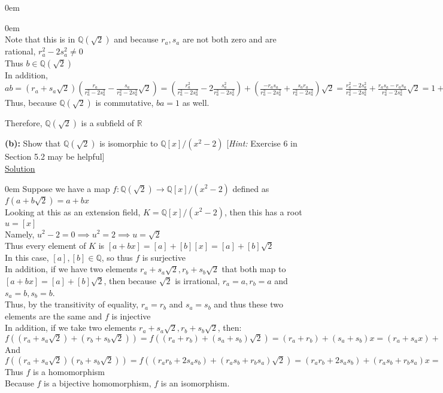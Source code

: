 \documentclass{article} %
\begin{document}
\begin{addmargin}[1em]{0em}
\begin{addmargin}[1em]{0em}
\\Note that this is in $\mathbb{Q}(\sqrt{2})$ and because $r_a, s_a$ are not both zero and are rational, $r_a^2 - 2s_a^2 \neq 0$
\\Thus $b \in \mathbb{Q}(\sqrt{2})$
\\In addition, $ab = (r_a + s_a\sqrt{2})(\frac{r_a}{r_a^2-2s_a^2} - \frac{s_a}{r_a^2-2s_a^2}\sqrt{2}) = (\frac{r_a^2}{r_a^2-2s_a^2} - 2\frac{s_a^2}{r_a^2 - 2s_a^2}) + (\frac{-r_as_a}{r_a^2-2s_a^2} + \frac{s_ar_a}{r_a^2-2s_a^2})\sqrt{2} = \frac{r_a^2 - 2s_a^2}{r_a^2- 2s_a^2} + \frac{r_as_a - r_as_a}{r_a^2 - 2s_a^2}\sqrt{2} = 1 + 0\sqrt{2} = 1$
\\Thus, because $\mathbb{Q}(\sqrt{2})$ is commutative, $ba = 1$ as well.
\end{addmargin}
Therefore, $\mathbb{Q}(\sqrt{2})$ is a subfield of $\mathbb{R}$
\end{addmargin}

\textbf{(b):} Show that $\mathbb{Q}(\sqrt{2})$ is isomorphic to $\mathbb{Q}[x]/(x^2-2)$ [\textit{Hint: }Exercise 6 in Section 5.2 may be helpful]
\\

\underline{Solution}
\begin{addmargin}[1em]{0em}
Suppose we have a map $f: \mathbb{Q}(\sqrt{2}) \rightarrow \mathbb{Q}[x]/(x^2-2)$ defined as $f(a+b\sqrt{2}) = a + bx$
\\Looking at this as an extension field, $K = \mathbb{Q}[x]/(x^2-2)$, then this has a root $u = [x]$
\\Namely, $u^2 - 2  = 0 \implies u^2 = 2 \implies u = \sqrt{2}$
\\Thus every element of $K$ is $[a + bx] = [a] + [b][x] = [a] + [b]\sqrt{2}$
\\In this case, $[a], [b] \in \mathbb{Q}$, so thus $f$ is surjective
\\In addition, if we have two elements $r_a + s_a\sqrt{2}, r_b+s_b\sqrt{2}$ that both map to $[a + bx] = [a] + [b]\sqrt{2}$, then because $\sqrt{2}$ is irrational, $r_a = a, r_b = a$ and $s_a = b, s_b = b$.
\\Thus, by the transitivity of equality, $r_a = r_b$ and $s_a = s_b$ and thus these two elements are the same and $f$ is injective
\\In addition, if we take two elements $r_a + s_a\sqrt{2}, r_b+s_b\sqrt{2}$, then:
\\$f((r_a + s_a\sqrt{2})+(r_b + s_b\sqrt{2})) = f((r_a + r_b) + (s_a + s_b)\sqrt{2}) = (r_a + r_b) + (s_a + s_b)x = (r_a + s_ax) + (r_b + s_bx) = f(r_a + s_a\sqrt{2}) + f(r_b + s_b\sqrt{2})$
\\And $f((r_a + s_a\sqrt{2})(r_b + s_b\sqrt{2})) = f((r_ar_b + 2s_as_b) + (r_as_b + r_bs_a)\sqrt{2}) = (r_ar_b + 2s_as_b) + (r_as_b + r_bs_a)x = (r_a + s_ax)(r_b+s_bx) = f(r_a+s_ax)f(r_b+s_bx)$
\\Thus $f$ is a homomorphism
\\Because $f$ is a bijective homomorphism, $f$ is an isomorphism.
\end{addmargin}
\end{document}
